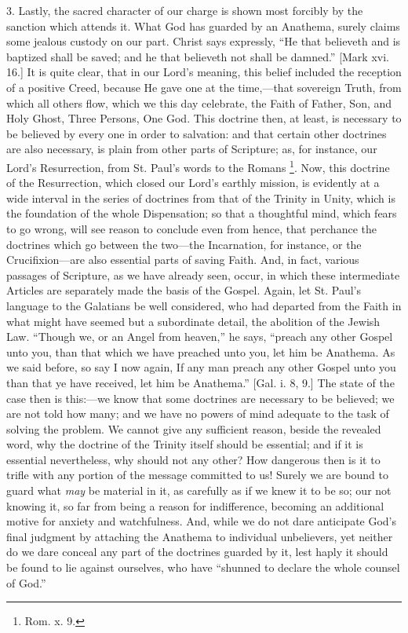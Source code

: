 3. Lastly, the sacred character of our charge is shown most forcibly
by the sanction which attends it. What God has guarded by an Anathema,
surely claims some jealous custody on our part. Christ says expressly,
``He that believeth and is baptized shall be saved; and he that
believeth not shall be damned.'' [Mark xvi. 16.] It is quite clear,
that in our Lord's meaning, this belief included the reception of a
positive Creed, because He gave one at the time,—that sovereign Truth,
from which all others flow, which we this day celebrate, the Faith of
Father, Son, and Holy Ghost, Three Persons, One God. This doctrine then,
at least, is necessary to be believed by every one in order to
salvation: and that certain other doctrines are also necessary, is plain
from other parts of Scripture; as, for instance, our Lord's
Resurrection, from St. Paul's words to the Romans \footnote{Rom. x. 9.}. Now, this
doctrine of the Resurrection, which closed our Lord's earthly mission,
is evidently at a wide interval in the series of doctrines from that of
the Trinity in Unity, which is the foundation of the whole Dispensation;
so that a thoughtful mind, which fears to go wrong, will see reason to
conclude even from hence, that perchance the doctrines which go between
the two—the Incarnation, for instance, or the Crucifixion—are also
essential parts of saving Faith. And, in fact, various passages of
Scripture, as we have already seen, occur, in which these intermediate
Articles are separately made the basis of the Gospel. Again, let St.
Paul's language to the Galatians be well considered, who had departed
from the Faith in what might have seemed but a subordinate detail, the
abolition of the Jewish Law. ``Though we, or an Angel from
heaven,'' he says, ``preach any other Gospel unto you, than that
which we have preached unto you, let him be Anathema. As we said before,
so say I now again, If any man preach any other Gospel unto you than
that ye have received, let him be Anathema.'' [Gal. i. 8, 9.] The
state of the case then is this:—we know that some doctrines are
necessary to be believed; we are not told how many; and we have no
powers of mind adequate to the task of solving the problem. We cannot
give any sufficient reason, beside the revealed word, why the doctrine
of the Trinity itself should be essential; and if it is essential
nevertheless, why should not any other? How dangerous then is it to
trifle with any portion of the message committed to us! Surely we are
bound to guard what \emph{may} be material in it, as carefully as if we
knew it to be so; our not knowing it, so far from being a reason for
indifference, becoming an additional motive for anxiety and
watchfulness. And, while we do not dare anticipate God's final judgment
by attaching the Anathema to individual unbelievers, yet neither do we
dare conceal any part of the doctrines guarded by it, lest haply it
should be found to lie against ourselves, who have ``shunned to
declare the whole counsel of God.''

